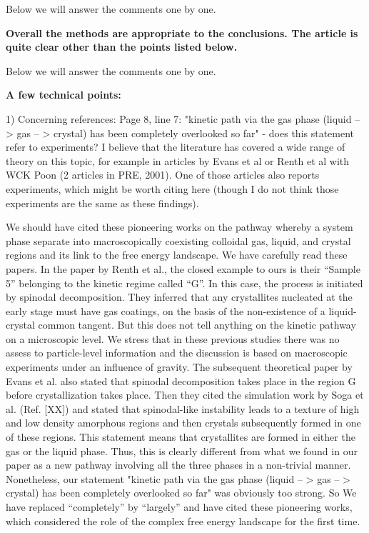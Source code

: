 \documentclass[11pt]{article}
\begin{document}
Below we will answer the comments one by one. 


\vspace{1em}

\singlespacing

{\bf
Overall the methods are appropriate to the conclusions. The article is quite clear other than the points listed below.
}


\bigskip
\doublespacing

Below we will answer the comments one by one. 


\vspace{1em}

\singlespacing

{\bf
A few technical points:

1) Concerning references: Page 8, line 7: "kinetic path via the gas phase (liquid -- > gas -- > crystal) has been completely overlooked so far" - does this statement refer to experiments? I believe that the literature has covered a wide range of theory on this topic, for example in articles by Evans et al or Renth et al with WCK Poon (2 articles in PRE, 2001). One of those articles also reports experiments, which might be worth citing here (though I do not think those experiments are the same as these findings).
}


\bigskip
\doublespacing
We should have cited these pioneering works on the pathway whereby a system phase separate into macroscopically coexisting colloidal gas, liquid, and crystal regions and its link to the free energy landscape. We have carefully read these papers. In the paper by Renth et al., the closed example to ours is their “Sample 5” belonging to the kinetic regime called “G”. In this case, the process is initiated by spinodal decomposition. They inferred that any crystallites nucleated at the early stage must have gas coatings, on the basis of the non-existence of a liquid-crystal common tangent. But this does not tell anything on the kinetic pathway on a microscopic level. We stress that in these previous studies there was no assess to particle-level information and the discussion is based on macroscopic experiments under an influence of gravity. The subsequent theoretical paper by Evans et al. also stated that spinodal decomposition takes place in the region G before crystallization takes place. Then they cited the simulation work by Soga et al. (Ref. [XX]) and stated that spinodal-like instability leads to a texture of high and low density amorphous regions and then crystals subsequently formed in one of these regions. This statement means that crystallites are formed in either the gas or the liquid phase. Thus, this is clearly different from what we found in our paper as a new pathway involving all the three phases in a non-trivial manner. 
Nonetheless, our statement "kinetic path via the gas phase (liquid -- > gas -- > crystal) has been completely overlooked so far" was obviously too strong. So We have replaced “completely” by “largely” and have cited these pioneering works, which considered the role of the complex free energy landscape for the first time. 
\end{document}
